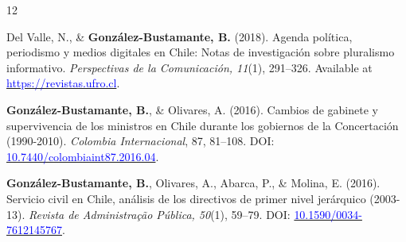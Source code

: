 \begin{publications}
\begin{benumerate}{12}
\item{Del Valle, N., \& {\bfseries González-Bustamante, B.} (2018). Agenda política, periodismo y medios digitales en Chile: Notas de investigación sobre pluralismo informativo. {\itshape Perspectivas de la Comunicación, 11}(1), 291--326. Available at \href{https://revistas.ufro.cl/ojs/index.php/perspectivas/article/view/1146}{\textcolor{blue}{https://revistas.ufro.cl}}.}\vspace{1mm}


\item{{\bfseries González-Bustamante, B.}, \& Olivares, A. (2016). Cambios de gabinete y supervivencia de los ministros en Chile durante los gobiernos de la Concertación (1990-2010). {\itshape Colombia Internacional}, 87, 81--108. DOI: \\ \href{https://doi.org/10.7440/colombiaint87.2016.04}{\textcolor{blue}{10.7440/colombiaint87.2016.04}}.}\vspace{1mm}


\item{{\bfseries González-Bustamante, B.}, Olivares, A., Abarca, P., \& Molina, E. (2016). Servicio civil en Chile, análisis de los directivos de primer nivel jerárquico (2003-13). {\itshape Revista de Administra\c{c}\~ao Pública, 50}(1), 59--79. DOI: \href{http://dx.doi.org/10.1590/0034-7612145767}{\textcolor{blue}{10.1590/0034-7612145767}}.} \vspace{1mm}



\end{benumerate}
\end{publications}

